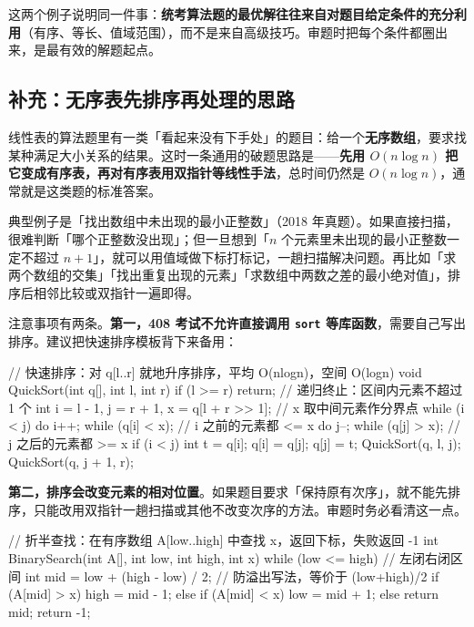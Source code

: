 \documentclass[11pt,openany,UTF8]{ctexbook}
\begin{document}
这两个例子说明同一件事：\textbf{统考算法题的最优解往往来自对题目给定条件的充分利用}（有序、等长、值域范围），而不是来自高级技巧。审题时把每个条件都圈出来，是最有效的解题起点。

\subsection{补充：无序表先排序再处理的思路}

线性表的算法题里有一类「看起来没有下手处」的题目：给一个\textbf{无序数组}，要求找某种满足大小关系的结果。这时一条通用的破题思路是——\textbf{先用 $O(n \log n)$ 把它变成有序表，再对有序表用双指针等线性手法}，总时间仍然是 $O(n\log n)$，通常就是这类题的标准答案。

典型例子是「找出数组中未出现的最小正整数」（2018 年真题）。如果直接扫描，很难判断「哪个正整数没出现」；但一旦想到「$n$ 个元素里未出现的最小正整数一定不超过 $n+1$」，就可以用值域做下标打标记，一趟扫描解决问题。再比如「求两个数组的交集」「找出重复出现的元素」「求数组中两数之差的最小绝对值」，排序后相邻比较或双指针一遍即得。

注意事项有两条。\textbf{第一，408 考试不允许直接调用 \texttt{sort} 等库函数}，需要自己写出排序。建议把快速排序模板背下来备用：

\begin{codebox}
// 快速排序：对 q[l..r] 就地升序排序，平均 O(nlogn)，空间 O(logn)
void QuickSort(int q[], int l, int r) {
    if (l >= r) return;                 // 递归终止：区间内元素不超过 1 个
    int i = l - 1, j = r + 1, x = q[l + r >> 1];  // x 取中间元素作分界点
    while (i < j) {
        do i++; while (q[i] < x);       // i 之前的元素都 <= x
        do j--; while (q[j] > x);       // j 之后的元素都 >= x
        if (i < j) { int t = q[i]; q[i] = q[j]; q[j] = t; }
    }
    QuickSort(q, l, j);
    QuickSort(q, j + 1, r);
}
\end{codebox}

\textbf{第二，排序会改变元素的相对位置}。如果题目要求「保持原有次序」，就不能先排序，只能改用双指针一趟扫描或其他不改变次序的方法。审题时务必看清这一点。

\begin{codebox}
// 折半查找：在有序数组 A[low..high] 中查找 x，返回下标，失败返回 -1
int BinarySearch(int A[], int low, int high, int x) {
    while (low <= high) {                  // 左闭右闭区间
        int mid = low + (high - low) / 2;  // 防溢出写法，等价于 (low+high)/2
        if (A[mid] > x)      high = mid - 1;
        else if (A[mid] < x) low = mid + 1;
        else                 return mid;
    }
    return -1;
}
\end{codebox}
\end{document}

